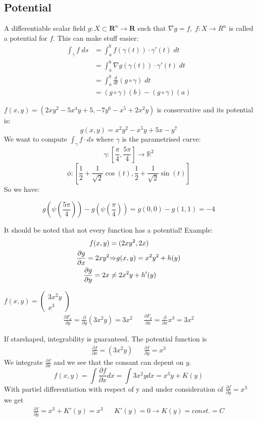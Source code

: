 \documentclass[8pt]{extarticle}
\newcommand{\R}{{\mathbb R}}
\newcommand{\X}{{\mathcal X}}
\newcommand{\ra}{{\rightarrow}}
\newcommand{\Ra}{{\Rightarrow}}
\def\R{\mathbf{R}}
\def\X{X}
\def\BoxStart{\begin{tcolorbox}[colback=blue!5!white,colframe=blue!75!black]}
\def\BoxEnd{\end{tcolorbox}}
\begin{document}
\begin{multicols*}{3}
  \subsection{Potential}
  A differentiable scalar field $g: \X \subset \R^n \ra \R$
  such that $\nabla g = f, \; f: \X \ra R^n$ is called
  a potential for $f$. This can make stuff easier:
  \begin{align*}
    \int_\gamma f \; ds & = \int_a^b f(\gamma(t)) \cdot \gamma'(t) \; dt        \\
                        & = \int_a^b \nabla g(\gamma(t)) \cdot \gamma'(t) \; dt \\
                        & = \int_a^b \frac{d}{dt} (g \circ \gamma) \; dt        \\
                        & = (g \circ \gamma)(b) - (g \circ \gamma)(a)
  \end{align*}
\BoxStart
$f(x,y) = (2xy^2 - 5x^4y + 5, -7y^6 - x^5 + 2x^2y)$ is conservative and its potential is:
$$g(x,y) = x^2y^2 - x^5y + 5x - y^7$$
We want to compute $\int_\gamma f \cdot ds$ where $\gamma$ is the parametrised curve:
$$ \gamma : \left[\frac{\pi}{4}, \frac{5\pi}{4}\right] \to \mathbb{R}^2$$
$$ \phi : \left[\frac{1}{2} + \frac{1}{\sqrt{2}} \cos(t), \frac{1}{2} + \frac{1}{\sqrt{2}} \sin(t)\right]$$
So we have:

	 $$g\left(\psi\left(\frac{5\pi}{4}\right)\right) - g\left(\psi\left(\frac{\pi}{4}\right)\right) =  g(0, 0) - g(1, 1) = -4$$

\BoxEnd
  It should be noted that not every function has a potential! Example:
  \begin{align*}
    f(x, y)            & = (2xy^2, 2x)               \\
    \pdv{g}{x} = 2xy^2 & \Ra g(x, y) = x^2y^2 + h(y) \\
    \pdv{g}{y} = 2x    & \neq 2x^2y + h'(y)
  \end{align*}
\BoxStart
$f(x,y) = 
\begin{pmatrix} 
3x^2 y \\
x^3 
\end{pmatrix}$
\begin{align*}
  \frac{\partial F_x}{\partial y} =\frac{\partial }{\partial y} (3x^2y) = 3x^2 &&  \frac{\partial F_y}{\partial x} =\frac{\partial }{\partial x} x^3 = 3x^2
\end{align*}

If starshaped, integrability is guaranteed. The potential function is
\begin{align*}
\frac{\partial f}{\partial x}  = (3x^2y) && \frac{\partial f}{\partial y} =  x^3
\end{align*}
We integrate $\frac{\partial f}{\partial x}$ and we see that the consant can depent on $y$.
$$f(x, y) = \int\frac{\partial f}{\partial x} dx = \int 3x^2y dx = x^3y + K(y)$$
With partiel differentiation with respect of y and under consideration of $\frac{\partial f}{\partial y} = x^3$ we get
\begin{align*}
	\frac{\partial f}{\partial y} =  x^3 + K'(y) = x^3 && K'(y) = 0 \rightarrow K(y) = const. = C
\end{align*}
\BoxEnd

\end{multicols*}
\end{document}
